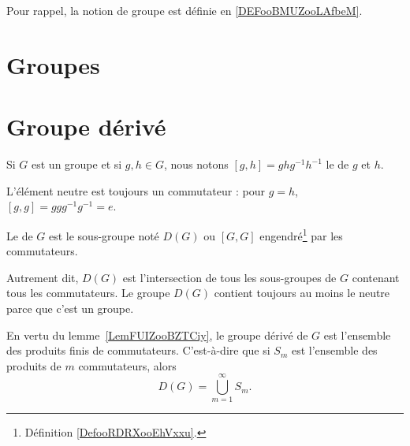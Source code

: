 
Pour rappel, la notion de groupe est définie en \ref{DEFooBMUZooLAfbeM}.

\section{Groupes}

\section{Groupe dérivé}

\begin{definition}      \label{DEFooVHZAooUgmesE}
	Si \( G\) est un groupe et si \( g,h\in G\), nous notons \( [g,h]=ghg^{-1}h^{-1}\) le  de \( g\) et \( h\).
\end{definition}

L'élément neutre est toujours un commutateur : pour \( g=h \), \( [g,g]=ggg^{-1}g^{-1}=e \).

\begin{definition}      \label{DEFooBNLPooShKYXa}
	Le  de \( G\) est le sous-groupe noté \( D(G)\) ou \( [G,G]\) engendré\footnote{Définition \ref{DefooRDRXooEhVxxu}.} par les commutateurs.
\end{definition}
Autrement dit, \( D(G)\) est l'intersection de tous les sous-groupes de \( G\) contenant tous les commutateurs. Le groupe \( D(G)\) contient toujours au moins le neutre parce que c'est un groupe.

En vertu du lemme~\ref{LemFUIZooBZTCiy}, le groupe dérivé de \( G\) est l'ensemble des produits finis de commutateurs. C'est-à-dire que si \( S_m\) est l'ensemble des produits de \( m\) commutateurs, alors
\begin{equation}
	D(G)=\bigcup_{m=1}^{\infty}S_m.
\end{equation}

